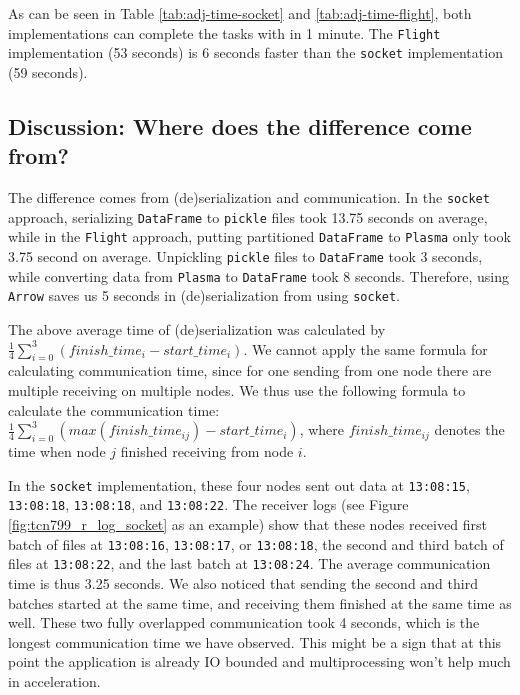 \documentclass{article}
\begin{document}
As can be seen in Table \ref{tab:adj-time-socket} and \ref{tab:adj-time-flight},
both implementations can complete the tasks with in 1 minute.
The \texttt{Flight} implementation (53 seconds) is 6 seconds faster than the \texttt{socket} implementation (59 seconds).

\subsection{Discussion: Where does the difference come from?}

The difference comes from (de)serialization and communication.
In the \texttt{socket} approach, serializing \texttt{DataFrame} to \texttt{pickle} files took 13.75 seconds on average,
while in the \texttt{Flight} approach, putting partitioned \texttt{DataFrame} to \texttt{Plasma} only took 3.75 second on average.
Unpickling \texttt{pickle} files to \texttt{DataFrame} took 3 seconds, while converting data from \texttt{Plasma} to \texttt{DataFrame} took 8 seconds.
Therefore, using \texttt{Arrow} saves us 5 seconds in (de)serialization from using \texttt{socket}.

The above average time of (de)serialization was calculated by $\frac{1}{4}\sum_{i=0}^{3} (finish\_time_i - start\_time_i)$.
We cannot apply the same formula for calculating communication time, since for one sending from one node there are multiple receiving on multiple nodes.
We thus use the following formula to calculate the communication time: $\frac{1}{4}\sum_{i=0}^{3} (max(finish\_time_{ij}) - start\_time_{i})$,
where $finish\_time_{ij}$ denotes the time when node $j$ finished receiving from node $i$.

In the \texttt{socket} implementation, these four nodes sent out data at \texttt{13:08:15}, \texttt{13:08:18}, \texttt{13:08:18}, and \texttt{13:08:22}.
The receiver logs (see Figure \ref{fig:tcn799_r_log_socket} as an example) show that these nodes received first batch of files at \texttt{13:08:16}, \texttt{13:08:17}, 
or \texttt{13:08:18}, the second and third batch of files at \texttt{13:08:22}, and the last batch at \texttt{13:08:24}.
The average communication time is thus 3.25 seconds.
We also noticed that sending the second and third batches started at the same time, and receiving them finished at the same time as well.
These two fully overlapped communication took 4 seconds, which is the longest communication time we have observed.
This might be a sign that at this point the application is already IO bounded and multiprocessing won't help much in acceleration.
\end{document}
